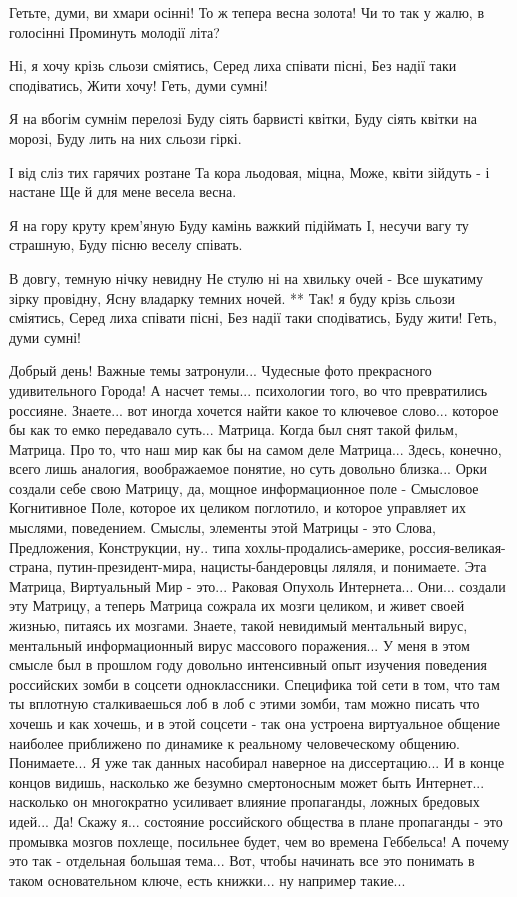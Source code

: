 Гетьте, думи, ви хмари осінні!
То ж тепера весна золота!
Чи то так у жалю, в голосінні
Проминуть молодії літа?

Ні, я хочу крізь сльози сміятись,
Серед лиха співати пісні,
Без надії таки сподіватись,
Жити хочу! Геть, думи сумні!

Я на вбогім сумнім перелозі
Буду сіять барвисті квітки,
Буду сіять квітки на морозі,
Буду лить на них сльози гіркі.

І від сліз тих гарячих розтане
Та кора льодовая, міцна,
Може, квіти зійдуть - і настане
Ще й для мене весела весна. 

Я на гору круту крем'яную
Буду камінь важкий підіймать
І, несучи вагу ту страшную,
Буду пісню веселу співать.

В довгу, темную нічку невидну
Не стулю ні на хвильку очей -
Все шукатиму зірку провідну,
Ясну владарку темних ночей. **
Так! я буду крізь сльози сміятись,
Серед лиха співати пісні,
Без надії таки сподіватись,
Буду жити! Геть, думи сумні!

Добрый день! Важные темы затронули... Чудесные фото прекрасного удивительного
Города! А насчет темы... психологии того, во что превратились россияне.
Знаете... вот иногда хочется найти какое то ключевое слово... которое бы как то
емко передавало суть... Матрица. Когда был снят такой фильм, Матрица. Про то,
что наш мир как бы на самом деле Матрица... Здесь, конечно, всего лишь
аналогия, воображаемое понятие, но суть довольно близка... Орки создали себе
свою Матрицу, да, мощное информационное поле - Смысловое Когнитивное Поле,
которое их целиком поглотило, и которое управляет их мыслями, поведением.
Смыслы, элементы этой Матрицы - это Слова, Предложения, Конструкции, ну.. типа
хохлы-продались-америке, россия-великая-страна, путин-президент-мира,
нацисты-бандеровцы ляляля, и понимаете. Эта Матрица, Виртуальный Мир - это...
Раковая Опухоль Интернета... Они... создали эту Матрицу, а теперь Матрица
сожрала их мозги целиком, и живет своей жизнью, питаясь их мозгами. Знаете,
такой невидимый ментальный вирус, ментальный информационный вирус массового
поражения... У меня в этом смысле был в прошлом году довольно интенсивный опыт
изучения поведения российских зомби в соцсети одноклассники. Специфика той сети
в том, что там ты вплотную сталкиваешься лоб в лоб с этими зомби, там можно
писать что хочешь и как хочешь, и в этой соцсети - так она устроена виртуальное
общение наиболее приближено по динамике к реальному человеческому общению.
Понимаете... Я уже так данных насобирал наверное на диссертацию... И в конце
концов видишь, насколько же безумно смертоносным может быть Интернет...
насколько он многократно усиливает влияние пропаганды, ложных бредовых идей...
Да! Скажу я... состояние российского общества в плане пропаганды - это промывка
мозгов похлеще, посильнее будет, чем во времена Геббельса! А почему это так -
отдельная большая тема... Вот, чтобы начинать все это понимать в таком
основательном ключе, есть книжки... ну например такие...

